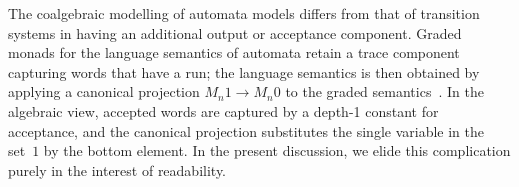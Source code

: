 \documentclass[a4paper,UKenglish,cleveref,thm-restate,numberwithinsect,final]{lipics-v2021}
\newcommand{\pow}{\mathcal{P}}
\newcommand{\powf}{\pow_{\omega}}
\theoremstyle{plain}
\numberwithin{equation}{section}
\newcommand{\+}[1]{\mathcal{#1}\xspace}
\theoremstyle{definition}
\newcommand{\Act}{\mathcal{A}}
\begin{document}
\begin{remark}\label{rem:automata}
  The coalgebraic modelling of automata models differs from that of
  transition systems in having an additional output or acceptance
  component. %
  Graded monads for the language semantics of automata retain a trace
  component capturing words that have a run; the language semantics is
  then obtained by applying a canonical projection $M_n1\to M_n0$ to
  the graded semantics~\cite{KurzEA15,MiliusEA15}. In the algebraic
  view, accepted words are captured by a depth-1 constant for
  acceptance, and the canonical projection substitutes the single
  variable in the set~$1$ by the bottom
  element. %
  In the present discussion, we elide this complication purely in the
  interest of readability.
\end{remark}
\end{document}
